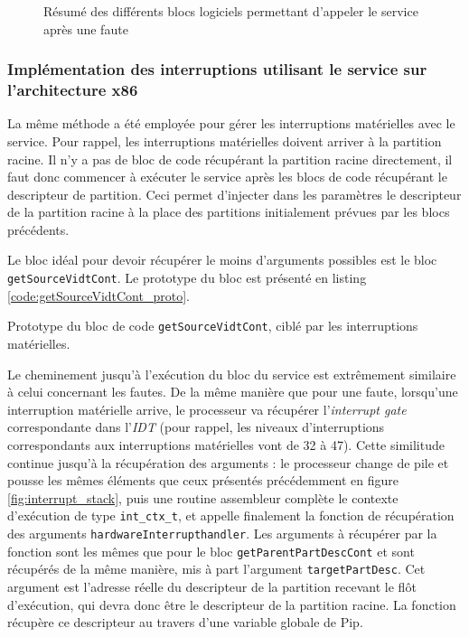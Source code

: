 		\begin{figure}[!ht]
			\centering
			
			\caption{Résumé des différents blocs logiciels permettant d'appeler le service après une faute}
			\label{fig:fault_software}
		\end{figure}

		\subsubsection{Implémentation des interruptions utilisant le service sur l'architecture x86}

		La même méthode a été employée pour gérer les interruptions matérielles avec le service. Pour rappel, les interruptions matérielles doivent arriver à la partition racine. Il n'y a pas de bloc de code récupérant la partition racine directement, il faut donc commencer à exécuter le service après les blocs de code récupérant le descripteur de partition. Ceci permet d'injecter dans les paramètres le descripteur de la partition racine à la place des partitions initialement prévues par les blocs précédents.

		Le bloc idéal pour devoir récupérer le moins d'arguments possibles est le bloc \texttt{getSourceVidtCont}. Le prototype du bloc est présenté en listing \ref{code:getSourceVidtCont_proto}.

		\begin{listing}[!ht]
			\caption{Prototype du bloc de code \texttt{getSourceVidtCont}, ciblé par les interruptions matérielles.}
			\label{code:getSourceVidtCont_proto}
		\end{listing}

		Le cheminement jusqu'à l'exécution du bloc du service est extrêmement similaire à celui concernant les fautes. De la même manière que pour une faute, lorsqu'une interruption matérielle arrive, le processeur va récupérer l'\emph{interrupt gate} correspondante dans l'\emph{IDT} (pour rappel, les niveaux d'interruptions correspondants aux interruptions matérielles vont de 32 à 47). Cette similitude continue jusqu'à la récupération des arguments : le processeur change de pile et pousse les mêmes éléments que ceux présentés précédemment en figure \ref{fig:interrupt_stack}, puis une routine assembleur complète le contexte d'exécution de type \texttt{int\_ctx\_t}, et appelle finalement la fonction de récupération des arguments \texttt{hardwareInterrupthandler}. Les arguments à récupérer par la fonction sont les mêmes que pour le bloc \texttt{getParentPartDescCont} et sont récupérés de la même manière, mis à part l'argument \texttt{targetPartDesc}. Cet argument est l'adresse réelle du descripteur de la partition recevant le flôt d'exécution, qui devra donc être le descripteur de la partition racine. La fonction récupère ce descripteur au travers d'une variable globale de Pip.

